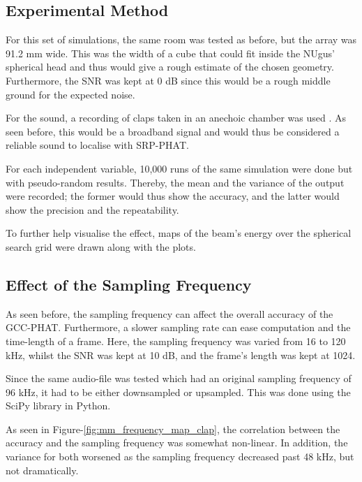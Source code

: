 \documentclass[notitlepage]{report}
\begin{document}
\subsection{Experimental Method}

For this set of simulations, the same room was tested as before, but the array was 91.2 \si{mm} wide. This was the width of a cube that could fit inside the NUgus' spherical head and thus would give a rough estimate of the chosen geometry. Furthermore, the SNR was kept at 0 \si{dB} since this would be a rough middle ground for the expected noise.

For the sound, a recording of claps taken in an anechoic chamber was used \cite{noauthor_handclaps_2005}. As seen before, this would be a broadband signal and would thus be considered a reliable sound to localise with SRP-PHAT.

For each independent variable, 10,000 runs of the same simulation were done but with pseudo-random results. Thereby, the mean and the variance of the output were recorded; the former would thus show the accuracy, and the latter would show the precision and the repeatability.

To further help visualise the effect, maps of the beam's energy over the spherical search grid were drawn along with the plots.

\subsection{Effect of the Sampling Frequency}

As seen before, the sampling frequency can affect the overall accuracy of the GCC-PHAT. Furthermore, a slower sampling rate can ease computation and the time-length of a frame. Here, the sampling frequency was varied from 16 to 120 \si{kHz}, whilst the SNR was kept at 10 \si{dB}, and the frame's length was kept at 1024.

Since the same audio-file was tested which had an original sampling frequency of 96 \si{kHz}, it had to be either downsampled or upsampled. This was done using the SciPy library in Python.

As seen in Figure-\ref{fig:mm_frequency_map_clap}, the correlation between the accuracy and the sampling frequency was somewhat non-linear. In addition, the variance for both worsened as the sampling frequency decreased past 48 \si{kHz}, but not dramatically.
\end{document}
